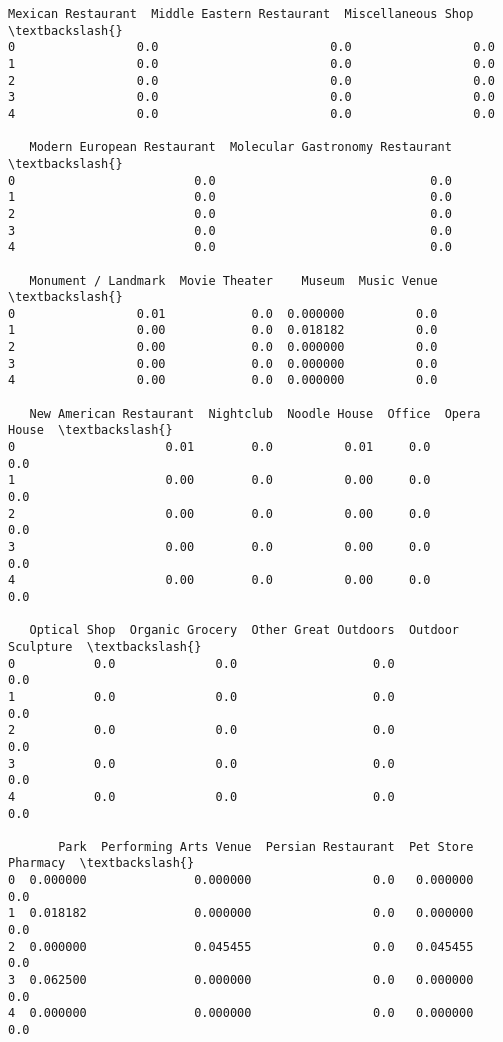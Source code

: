 \documentclass[11pt]{article}
\begin{document}
\begin{tcolorbox}[breakable, size=fbox, boxrule=.5pt, pad at break*=1mm, opacityfill=0]
\begin{Verbatim}[commandchars=\\\{\}]
   Mexican Restaurant  Middle Eastern Restaurant  Miscellaneous Shop  \textbackslash{}
0                 0.0                        0.0                 0.0
1                 0.0                        0.0                 0.0
2                 0.0                        0.0                 0.0
3                 0.0                        0.0                 0.0
4                 0.0                        0.0                 0.0

   Modern European Restaurant  Molecular Gastronomy Restaurant  \textbackslash{}
0                         0.0                              0.0
1                         0.0                              0.0
2                         0.0                              0.0
3                         0.0                              0.0
4                         0.0                              0.0

   Monument / Landmark  Movie Theater    Museum  Music Venue  \textbackslash{}
0                 0.01            0.0  0.000000          0.0
1                 0.00            0.0  0.018182          0.0
2                 0.00            0.0  0.000000          0.0
3                 0.00            0.0  0.000000          0.0
4                 0.00            0.0  0.000000          0.0

   New American Restaurant  Nightclub  Noodle House  Office  Opera House  \textbackslash{}
0                     0.01        0.0          0.01     0.0          0.0
1                     0.00        0.0          0.00     0.0          0.0
2                     0.00        0.0          0.00     0.0          0.0
3                     0.00        0.0          0.00     0.0          0.0
4                     0.00        0.0          0.00     0.0          0.0

   Optical Shop  Organic Grocery  Other Great Outdoors  Outdoor Sculpture  \textbackslash{}
0           0.0              0.0                   0.0                0.0
1           0.0              0.0                   0.0                0.0
2           0.0              0.0                   0.0                0.0
3           0.0              0.0                   0.0                0.0
4           0.0              0.0                   0.0                0.0

       Park  Performing Arts Venue  Persian Restaurant  Pet Store  Pharmacy  \textbackslash{}
0  0.000000               0.000000                 0.0   0.000000       0.0
1  0.018182               0.000000                 0.0   0.000000       0.0
2  0.000000               0.045455                 0.0   0.045455       0.0
3  0.062500               0.000000                 0.0   0.000000       0.0
4  0.000000               0.000000                 0.0   0.000000       0.0


\end{Verbatim}
\end{tcolorbox}
\end{document}
